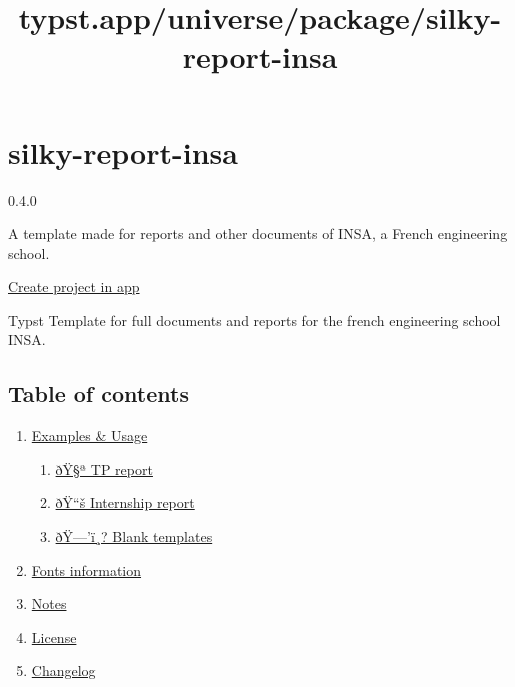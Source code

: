 \title{typst.app/universe/package/silky-report-insa}

\label{banner}
\label{template-thumbnail}

\section{silky-report-insa}\label{silky-report-insa}

{ 0.4.0 }

A template made for reports and other documents of INSA, a French
engineering school.

\href{/app?template=silky-report-insa&version=0.4.0}{Create project in
app}

\label{readme}
Typst Template for full documents and reports for the french engineering
school INSA.

\subsection{Table of contents}\label{table-of-contents}

\begin{enumerate}
\tightlist
\item
  \href{https://github.com/typst/packages/raw/main/packages/preview/silky-report-insa/0.4.0/\#examples}{Examples
  \& Usage}

  \begin{enumerate}
  \tightlist
  \item
    \href{https://github.com/typst/packages/raw/main/packages/preview/silky-report-insa/0.4.0/\#\%F0\%9F\%A7\%AA-tp-report}{ðŸ§ª
    TP report}
  \item
    \href{https://github.com/typst/packages/raw/main/packages/preview/silky-report-insa/0.4.0/\#\%F0\%9F\%93\%9A-internship-report}{ðŸ``š
    Internship report}
  \item
    \href{https://github.com/typst/packages/raw/main/packages/preview/silky-report-insa/0.4.0/\#\%F0\%9F\%97\%92\%EF\%B8\%8F-blank-templates}{ðŸ---'ï¸?
    Blank templates}
  \end{enumerate}
\item
  \href{https://github.com/typst/packages/raw/main/packages/preview/silky-report-insa/0.4.0/\#fonts}{Fonts
  information}
\item
  \href{https://github.com/typst/packages/raw/main/packages/preview/silky-report-insa/0.4.0/\#notes}{Notes}
\item
  \href{https://github.com/typst/packages/raw/main/packages/preview/silky-report-insa/0.4.0/\#license}{License}
\item
  \href{https://github.com/typst/packages/raw/main/packages/preview/silky-report-insa/0.4.0/\#changelog}{Changelog}
\end{enumerate}

